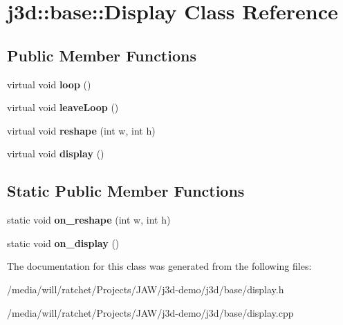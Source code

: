 \hypertarget{classj3d_1_1base_1_1Display}{}\section{j3d\+:\+:base\+:\+:Display Class Reference}
\label{classj3d_1_1base_1_1Display}
\subsection*{Public Member Functions}
\begin{DoxyCompactItemize}
\item 
\hypertarget{classj3d_1_1base_1_1Display_a4e83840b1b123cef2e51407519690612}{}virtual void {\bfseries loop} ()\label{classj3d_1_1base_1_1Display_a4e83840b1b123cef2e51407519690612}

\item 
\hypertarget{classj3d_1_1base_1_1Display_ae7f891cbe85bb44215a472368b34ce90}{}virtual void {\bfseries leave\+Loop} ()\label{classj3d_1_1base_1_1Display_ae7f891cbe85bb44215a472368b34ce90}

\item 
\hypertarget{classj3d_1_1base_1_1Display_a049e9fe3de7c97be0ff2f6c2f9036eb9}{}virtual void {\bfseries reshape} (int w, int h)\label{classj3d_1_1base_1_1Display_a049e9fe3de7c97be0ff2f6c2f9036eb9}

\item 
\hypertarget{classj3d_1_1base_1_1Display_a732bf03f4a598c8d3785e0f27c616b19}{}virtual void {\bfseries display} ()\label{classj3d_1_1base_1_1Display_a732bf03f4a598c8d3785e0f27c616b19}

\end{DoxyCompactItemize}
\subsection*{Static Public Member Functions}
\begin{DoxyCompactItemize}
\item 
\hypertarget{classj3d_1_1base_1_1Display_a8259059d2ac08fe08c19dfc677d3229b}{}static void {\bfseries on\+\_\+reshape} (int w, int h)\label{classj3d_1_1base_1_1Display_a8259059d2ac08fe08c19dfc677d3229b}

\item 
\hypertarget{classj3d_1_1base_1_1Display_ae1e111a7d45e13b4ae0e03fff9baaad9}{}static void {\bfseries on\+\_\+display} ()\label{classj3d_1_1base_1_1Display_ae1e111a7d45e13b4ae0e03fff9baaad9}

\end{DoxyCompactItemize}


The documentation for this class was generated from the following files\+:\begin{DoxyCompactItemize}
\item 
/media/will/ratchet/\+Projects/\+J\+A\+W/j3d-\/demo/j3d/base/display.\+h\item 
/media/will/ratchet/\+Projects/\+J\+A\+W/j3d-\/demo/j3d/base/display.\+cpp\end{DoxyCompactItemize}
